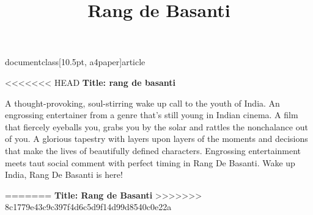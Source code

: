 
documentclass[10.5pt, a4paper]{article}
\usepackage{amsfonts}
\usepackage[top=1in,left=1in,right=1in]{geometry}
\usepackage{times}
\usepackage{tabularx}
\title{Rang de Basanti}

\maketitle
<<<<<<< HEAD
\textbf{Title: rang de basanti}

A thought-provoking, soul-stirring wake up call to the youth of India. An engrossing entertainer from a genre
 that's still young in Indian cinema. A film that fiercely eyeballs you, grabs you by the solar and rattles the
 nonchalance out of you. A glorious tapestry with layers upon layers of the moments and decisions that make the
 lives of beautifully defined characters. Engrossing entertainment meets taut social comment with perfect timing
 in Rang De Basanti. Wake up India, Rang De Basanti is here!

=======
\textbf{Title: Rang de Basanti}
>>>>>>> 8c1779e43c9c397f4d6c5d9f14d99d8540c0e22a

